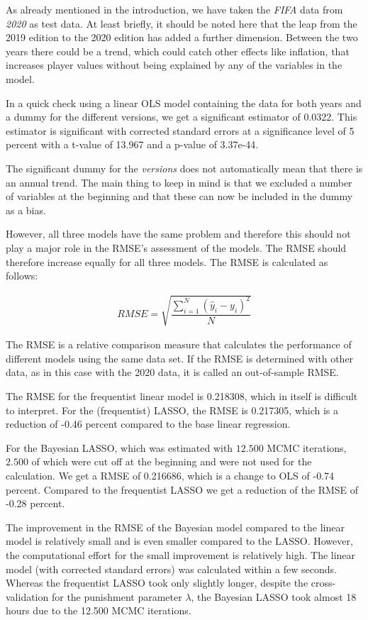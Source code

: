\documentclass[12pt,a4paper]{article}
\begin{document}
As already mentioned in the introduction, we have taken the \emph{FIFA}
data from \emph{2020} as test data. At least briefly, it should be noted
here that the leap from the 2019 edition to the 2020 edition has added a
further dimension. Between the two years there could be a trend, which
could catch other effects like inflation, that increases player values
without being explained by any of the variables in the model.

In a quick check using a linear \ac{OLS} model containing the data for
both years and a dummy for the different versions, we get a significant
estimator of 0.0322. This estimator is significant with corrected
standard errors at a significance level of 5 percent with a t-value of
13.967 and a p-value of 3.37e-44.

The significant dummy for the \emph{versions} does not automatically
mean that there is an annual trend. The main thing to keep in mind is
that we excluded a number of variables at the beginning and that these
can now be included in the dummy as a bias.

However, all three models have the same problem and therefore this
should not play a major role in the RMSE's assessment of the models. The
RMSE should therefore increase equally for all three models. The
\acf{RMSE} is calculated as follows:

\begin{align*} 
  RMSE = \sqrt{ \dfrac{ \displaystyle \sum_{i = 1}^{N} \left( \hat{y}_i  - y_i \right)^2} {N}    }
\end{align*}

The \ac{RMSE} is a relative comparison measure that calculates the
performance of different models using the same data set. If the
\ac{RMSE} is determined with other data, as in this case with the 2020
data, it is called an out-of-sample RMSE.

The RMSE for the frequentist linear model is 0.218308, which in itself
is difficult to interpret. For the (frequentist) LASSO, the RMSE is
0.217305, which is a reduction of -0.46 percent compared to the base
linear regression.

For the Bayesian \ac{LASSO}, which was estimated with \(12.500\)
\ac{MCMC} iterations, \(2.500\) of which were cut off at the beginning
and were not used for the calculation. We get a \ac{RMSE} of 0.216686,
which is a change to \ac{OLS} of -0.74 percent. Compared to the
frequentist \ac{LASSO} we get a reduction of the RMSE of -0.28 percent.

The improvement in the \ac{RMSE} of the Bayesian model compared to the
linear model is relatively small and is even smaller compared to the
\ac{LASSO}. However, the computational effort for the small improvement
is relatively high. The linear model (with corrected standard errors)
was calculated within a few seconds. Whereas the frequentist \ac{LASSO}
took only slightly longer, despite the cross-validation for the
punishment parameter \(\lambda\), the Bayesian \ac{LASSO} took almost 18
hours due to the 12.500 \ac{MCMC} iterations.
\end{document}
